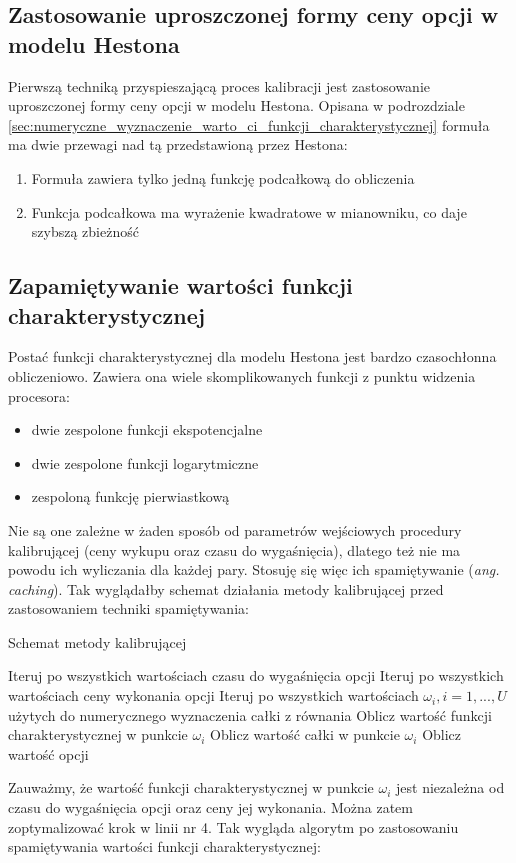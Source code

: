 \documentclass{pracamgr}
\begin{document}
\subsection{Zastosowanie uproszczonej formy ceny opcji w modelu Hestona} %
\label{sec:uproszczona_forma}

Pierwszą techniką przyspieszającą proces kalibracji jest zastosowanie uproszczonej formy ceny opcji w 
modelu Hestona. 
Opisana w podrozdziale \ref{sec:numeryczne_wyznaczenie_warto_ci_funkcji_charakterystycznej} 
formuła ma dwie przewagi nad tą przedstawioną przez Hestona:
\begin{enumerate}
  \item Formuła zawiera tylko jedną funkcję podcałkową do obliczenia
  \item Funkcja podcałkowa ma wyrażenie kwadratowe w mianowniku, co daje szybszą zbieżność  \cite{Attari}
\end{enumerate}

\subsection{Zapamiętywanie wartości funkcji charakterystycznej}
Postać funkcji charakterystycznej dla modelu Hestona jest bardzo czasochłonna obliczeniowo. 
Zawiera ona wiele skomplikowanych funkcji z punktu widzenia procesora:
\begin{itemize}
  \item dwie zespolone funkcji ekspotencjalne
  \item dwie zespolone funkcji logarytmiczne
  \item zespoloną funkcję pierwiastkową
\end{itemize}
Nie są one zależne w żaden sposób od parametrów wejściowych procedury kalibrującej (ceny wykupu oraz 
czasu do wygaśnięcia), dlatego też nie ma powodu ich wyliczania dla każdej pary. 
Stosuję się więc ich spamiętywanie (\textit{ang. caching}).
Tak wyglądałby schemat działania metody kalibrującej \cite{AcceleratingHeston} przed zastosowaniem 
techniki spamiętywania:
\begin{algorithm}[H]
\caption{Schemat metody kalibrującej}\label{euclid}
\begin{algorithmic}[1]
  \State Iteruj po wszystkich wartościach czasu do wygaśnięcia opcji
  \State Iteruj po wszystkich wartościach ceny wykonania opcji
  \State Iteruj po wszystkich wartościach $\omega_i, i = 1, ..., U $ użytych do numerycznego wyznaczenia całki z równania   
  \State Oblicz wartość funkcji charakterystycznej w punkcie $\omega_i$
  \State Oblicz wartość całki w punkcie $\omega_i$
  \State Oblicz wartość opcji
\end{algorithmic}
\label{alg:simulatedAnnealing}
\end{algorithm}
Zauważmy, że wartość funkcji charakterystycznej w punkcie $\omega_i$ jest niezależna od czasu do 
wygaśnięcia opcji oraz ceny jej wykonania. Można zatem zoptymalizować krok w linii nr 4. Tak wygląda 
algorytm po zastosowaniu spamiętywania wartości funkcji charakterystycznej:
\end{document}
